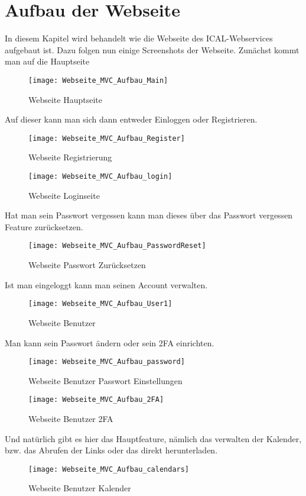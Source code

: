 {\section{Aufbau der Webseite }
\label{sec:aufbau}
In diesem Kapitel wird behandelt wie die Webseite des ICAL-Webservices aufgebaut ist. Dazu folgen nun einige Screenshots der Webseite.
Zunächst kommt man auf die Hauptseite\\
\begin{figure}[H]
    \texttt{[image: Webseite\_MVC\_Aufbau\_Main]}
    \caption{Webseite Hauptseite}
    \label{fig:webmainpage}
\end{figure}
Auf dieser kann man sich dann entweder Einloggen oder Registrieren.\\
\begin{figure}[H]
    \texttt{[image: Webseite\_MVC\_Aufbau\_Register]}
    \caption{Webseite Registrierung}
    \label{fig:webregister}
\end{figure}
\begin{figure}[H]
    \texttt{[image: Webseite\_MVC\_Aufbau\_login]}
    \caption{Webseite Loginseite}
    \label{fig:weblogin}
\end{figure}
Hat man sein Passwort vergessen kann man dieses über das Passwort vergessen Feature zurücksetzen. 
\begin{figure}[H]
    \texttt{[image: Webseite\_MVC\_Aufbau\_PasswordReset]}
    \caption{Webseite Passwort Zurücksetzen}
    \label{fig:webpwdforgot}
\end{figure}
Ist man eingeloggt kann man seinen Account verwalten.\\
\begin{figure}[H]
    \texttt{[image: Webseite\_MVC\_Aufbau\_User1]}
    \caption{Webseite Benutzer}
    \label{fig:webuser}
\end{figure}
Man kann sein Passwort ändern oder sein 2FA einrichten. \\
\begin{figure}[H]
    \texttt{[image: Webseite\_MVC\_Aufbau\_password]}
    \caption{Webseite Benutzer Passwort Einstellungen}
    \label{fig:webuserpwd}
\end{figure}
\begin{figure}[H]
    \texttt{[image: Webseite\_MVC\_Aufbau\_2FA]}
    \caption{Webseite Benutzer 2FA}
    \label{fig:webuser2fa}
\end{figure}
Und natürlich gibt es hier das Hauptfeature, nämlich das verwalten der Kalender, bzw. das Abrufen der Links oder das direkt herunterladen.\\
\begin{figure}[H]
    \texttt{[image: Webseite\_MVC\_Aufbau\_calendars]}
    \caption{Webseite Benutzer Kalender}
    \label{fig:webusercal}
\end{figure}
}
